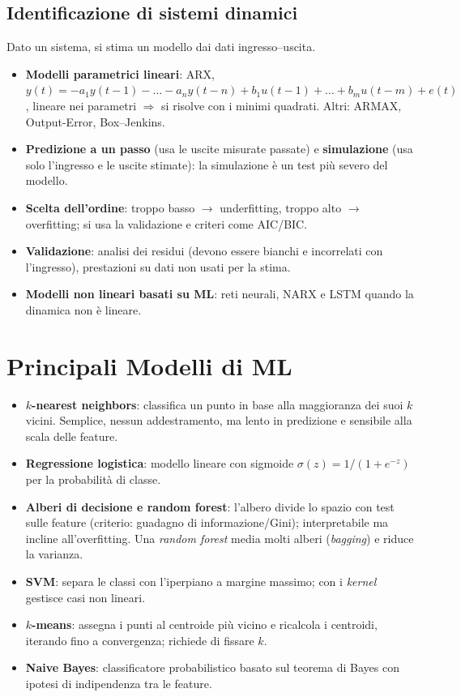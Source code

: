 \subsection{Identificazione di sistemi dinamici}
Dato un sistema, si stima un modello dai dati ingresso--uscita.
\begin{itemize}
    \item \textbf{Modelli parametrici lineari}: ARX, $y(t) = -a_1y(t-1) - \dots - a_ny(t-n) + b_1u(t-1)+\dots+b_mu(t-m)+e(t)$, lineare nei parametri $\Rightarrow$ si risolve con i minimi quadrati. Altri: ARMAX, Output-Error, Box--Jenkins.
    \item \textbf{Predizione a un passo} (usa le uscite misurate passate) e \textbf{simulazione} (usa solo l'ingresso e le uscite stimate): la simulazione è un test più severo del modello.
    \item \textbf{Scelta dell'ordine}: troppo basso $\to$ underfitting, troppo alto $\to$ overfitting; si usa la validazione e criteri come AIC/BIC.
    \item \textbf{Validazione}: analisi dei residui (devono essere bianchi e incorrelati con l'ingresso), prestazioni su dati non usati per la stima.
    \item \textbf{Modelli non lineari basati su ML}: reti neurali, NARX e LSTM quando la dinamica non è lineare.
\end{itemize}

\section{Principali Modelli di ML}
\begin{itemize}
    \item \textbf{$k$-nearest neighbors}: classifica un punto in base alla maggioranza dei suoi $k$ vicini. Semplice, nessun addestramento, ma lento in predizione e sensibile alla scala delle feature.
    \item \textbf{Regressione logistica}: modello lineare con sigmoide $\sigma(z)=1/(1+e^{-z})$ per la probabilità di classe.
    \item \textbf{Alberi di decisione e random forest}: l'albero divide lo spazio con test sulle feature (criterio: guadagno di informazione/Gini); interpretabile ma incline all'overfitting. Una \emph{random forest} media molti alberi (\emph{bagging}) e riduce la varianza.
    \item \textbf{SVM}: separa le classi con l'iperpiano a margine massimo; con i \emph{kernel} gestisce casi non lineari.
    \item \textbf{$k$-means}: assegna i punti al centroide più vicino e ricalcola i centroidi, iterando fino a convergenza; richiede di fissare $k$.
    \item \textbf{Naive Bayes}: classificatore probabilistico basato sul teorema di Bayes con ipotesi di indipendenza tra le feature.
\end{itemize}

